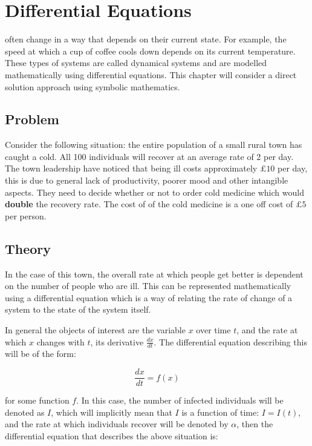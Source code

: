 \chapter[Differential Equations]{Differential Equations}

 often change in a way that depends on their current
state. For example, the speed at which a cup of coffee cools down depends on its
current temperature. These types of systems are called dynamical systems and are
modelled mathematically using differential equations. This chapter will
consider a direct solution approach using symbolic mathematics.

\section{Problem}\label{sec:differential_equations_problem}

Consider the following situation: the entire population of a small rural town
has caught a cold. All 100 individuals will recover at an average rate of 2 per
day. The town leadership have noticed that being ill costs approximately
\(\pounds10\) per day, this is due to general lack of productivity, poorer mood and
other intangible aspects. They need to decide whether or not to order cold
medicine which would \textbf{double} the recovery rate. The cost of of the cold
medicine is a one off cost of \(\pounds5\) per person.

\section{Theory}\label{sec:differential_equations_theory}

In the case of this town, the overall rate at which people get better is
dependent on the number of people who are ill. This can be represented
mathematically using a differential equation which is a way of relating the rate
of change of a system to the state of the system itself.

In general the objects of interest are the variable \(x\) over time \(t\), and
the rate at which \(x\) changes with \(t\), its derivative \(\frac{dx}{dt}\).
The differential equation describing this will be of the form:

\begin{equation}
    \frac{dx}{dt} = f(x)
\end{equation}

for some function \(f\).
In this case,
the number of infected individuals will be denoted as \(I\), which will
implicitly mean that \(I\) is a function of time: \(I=I(t)\), and the rate at
which individuals recover will be denoted by \(\alpha\), then the
differential equation that describes the above situation is:

